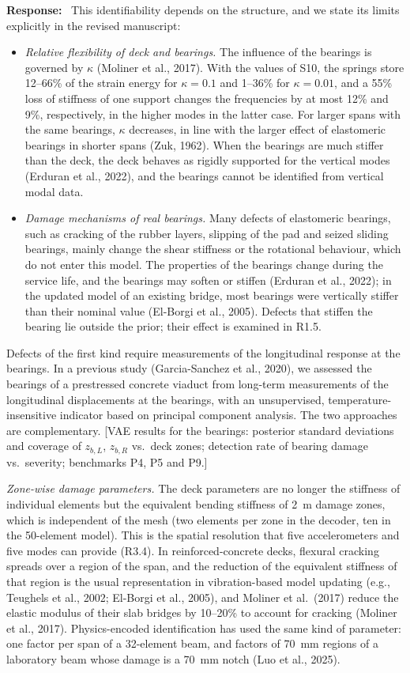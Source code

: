 \documentclass[11pt]{article}
\newenvironment{response}{\par\smallskip\noindent\color{resp}\textbf{Response:}\ }{\par}
\newcommand{\tbd}[1]{\textcolor{note}{\textsf{[#1]}}}
\begin{document}
\begin{response}
This identifiability depends on the structure, and we state its limits explicitly in the revised manuscript:
\begin{itemize}[leftmargin=*]
\item \emph{Relative flexibility of deck and bearings.} The influence of the bearings is governed by $\kappa$ (Moliner et al., 2017). With the
values of S10, the springs store 12--66\% of the strain energy for $\kappa=0.1$ and 1--36\% for $\kappa=0.01$, and a 55\% loss of stiffness of
one support changes the frequencies by at most 12\% and 9\%, respectively, in the higher modes in the latter case. For larger spans with the same bearings, $\kappa$ decreases, in line with the larger
effect of elastomeric bearings in shorter spans (Zuk, 1962). When the bearings are much stiffer than the deck, the deck behaves as rigidly supported for the
vertical modes (Erduran et al., 2022), and the bearings cannot be identified from vertical modal data.
\item \emph{Damage mechanisms of real bearings.} Many defects of elastomeric bearings, such as cracking of the rubber layers, slipping of the pad and seized
sliding bearings, mainly change the shear stiffness or the rotational behaviour, which do not enter this model. The properties of the bearings change during
the service life, and the bearings may soften or stiffen (Erduran et al., 2022); in the updated model of an existing bridge, most bearings were vertically
stiffer than their nominal value (El-Borgi et al., 2005). Defects that stiffen the bearing lie outside the prior; their effect is examined in R1.5.
\end{itemize}
Defects of the first kind require measurements of the longitudinal response at the bearings. In a previous study
(Garcia-Sanchez et al., 2020), we assessed the bearings of a prestressed concrete viaduct from long-term measurements of
the longitudinal displacements at the bearings, with an unsupervised, temperature-insensitive indicator based on
principal component analysis. The two approaches are complementary.
\tbd{VAE results for the bearings: posterior standard deviations and coverage of $z_{b,L}$, $z_{b,R}$ vs.\ deck zones;
detection rate of bearing damage vs.\ severity; benchmarks P4, P5 and P9.}

\textit{Zone-wise damage parameters.} The deck parameters are no longer the stiffness of individual elements but the
equivalent bending stiffness of 2~m damage zones, which is independent of the mesh (two elements per zone in the
decoder, ten in the 50-element model). This is the spatial resolution that five accelerometers and five modes can
provide (R3.4). In reinforced-concrete decks, flexural cracking spreads over a region of the span, and the reduction of
the equivalent stiffness of that region is the usual representation in vibration-based model updating (e.g., Teughels
et al., 2002; El-Borgi et al., 2005), and Moliner et al.\ (2017) reduce the elastic modulus of their slab bridges by 10--20\% to
account for cracking (Moliner et al., 2017). Physics-encoded identification has used the same kind of
parameter: one factor per span of a 32-element beam, and factors of 70~mm regions of a laboratory beam whose damage is a 70~mm
notch (Luo et al., 2025).


\end{response}
\end{document}
